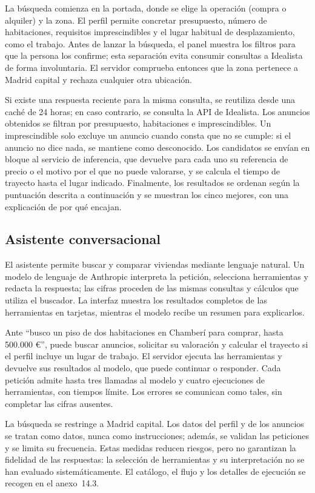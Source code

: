 \documentclass[11pt,a4paper]{article}
\newcounter{anexo}
\begin{document}
La búsqueda comienza en la portada, donde se elige la operación (compra o alquiler) y la zona. El perfil permite concretar presupuesto, número de habitaciones, requisitos imprescindibles y el lugar habitual de desplazamiento, como el trabajo. Antes de lanzar la búsqueda, el panel muestra los filtros para que la persona los confirme; esta separación evita consumir consultas a Idealista de forma involuntaria. El servidor comprueba entonces que la zona pertenece a Madrid capital y rechaza cualquier otra ubicación.

Si existe una respuesta reciente para la misma consulta, se reutiliza desde una caché de 24 horas; en caso contrario, se consulta la API de Idealista. Los anuncios obtenidos se filtran por presupuesto, habitaciones e imprescindibles. Un imprescindible solo excluye un anuncio cuando consta que no se cumple: si el anuncio no dice nada, se mantiene como desconocido. Los candidatos se envían en bloque al servicio de inferencia, que devuelve para cada uno su referencia de precio o el motivo por el que no puede valorarse, y se calcula el tiempo de trayecto hasta el lugar indicado. Finalmente, los resultados se ordenan según la puntuación descrita a continuación y se muestran los cinco mejores, con una explicación de por qué encajan.

\subsection{Asistente conversacional}

El asistente permite buscar y comparar viviendas mediante lenguaje natural. Un modelo de lenguaje de Anthropic interpreta la petición, selecciona herramientas y redacta la respuesta; las cifras proceden de las mismas consultas y cálculos que utiliza el buscador. La interfaz muestra los resultados completos de las herramientas en tarjetas, mientras el modelo recibe un resumen para explicarlos.

Ante ``busco un piso de dos habitaciones en Chamberí para comprar, hasta 500.000 €'', puede buscar anuncios, solicitar su valoración y calcular el trayecto si el perfil incluye un lugar de trabajo. El servidor ejecuta las herramientas y devuelve sus resultados al modelo, que puede continuar o responder. Cada petición admite hasta tres llamadas al modelo y cuatro ejecuciones de herramientas, con tiempos límite. Los errores se comunican como tales, sin completar las cifras ausentes.

La búsqueda se restringe a Madrid capital. Los datos del perfil y de los anuncios se tratan como datos, nunca como instrucciones; además, se validan las peticiones y se limita su frecuencia. Estas medidas reducen riesgos, pero no garantizan la fidelidad de las respuestas: la selección de herramientas y su interpretación no se han evaluado sistemáticamente. El catálogo, el flujo y los detalles de ejecución se recogen en el anexo~14.3.
\end{document}
